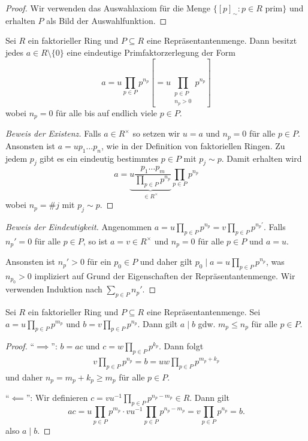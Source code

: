 \begin{proof}
	Wir verwenden das Auswahlaxiom für die Menge $\{[p]_{\sim}: p \in R \text{ prim}\} $ und erhalten
	$P$ als Bild der Auswahlfunktion.
\end{proof}

\begin{theorem}
	Sei $R$ ein faktorieller Ring und $P \subseteq R$ eine Repräsentantenmenge.
	Dann besitzt jedes $a \in R \setminus \{0\}$ eine eindeutige Primfaktorzerlegung
	der Form 
	\[
		a = u \prod_{p \in P} p^{n_p} \left[ = u \prod_{\substack{p \in P\\ n_{p} > 0}} p^{n_{p}}  \right]
	\] 
	wobei $n_{p} = 0$ für alle bis auf endlich viele $p \in P$.
\end{theorem}

\begin{proof}[Beweis der Existenz]
	Falls $a \in R^{\times}$ so setzen wir $u = a$ und $n_{p} = 0$ für alle $p \in P$.
	Ansonsten ist $a = u p_1 \ldots p_{n}$, wie in der Definition von faktoriellen Ringen.
	Zu jedem $p_{j}$ gibt es ein eindeutig bestimmtes $p \in P$ mit $p_{j} \sim p$.
	Damit erhalten wird
	\[
		a = \underbrace{u \frac{p_1 \ldots p_{m}}{\prod_{p \in P} p^{n_{p}} }}_{\in R^{\times}} \prod_{p \in P} p^{n_{p}}
	\] 
	wobei $n_{p} = \#j$ mit $p_{j} \sim p$.
\end{proof}

\begin{proof}[Beweis der Eindeutigkeit]
	Angenommen $a = u \prod_{p \in P} p^{n_{p}} = v \prod_{p \in P} p^{n_{p}'}$.
	Falls $n_{p}' = 0$ für alle $p \in  P$, so ist $a = v \in R^{\times}$ und $n_{p} = 0$ für alle $p \in P$ und $a = u$.

	Ansonsten ist $n_{p}' > 0$ für ein $p_0 \in P$ und daher gilt $p_0 \mid a = u \prod_{p \in P} p^{n_{p}}$,
	was $n_{p_0} > 0$ impliziert auf Grund der Eigenschaften der Repräsentantenmenge.
	Wir verwenden Induktion nach $\sum_{p \in P} n_{p}' $.
\end{proof}

\begin{lemma}
	Sei $R$ ein faktorieller Ring und $P \subseteq R$ eine Repräsentantenmenge.
	Sei $a = u \prod_{p \in P} p^{m_{p}}$ und $b = v \prod_{p \in P} p^{n_{p}}$.
	Dann gilt $a \mid b$ gdw. $m_{p} \leq n_{p}$ für alle $p \in P$.
\end{lemma}

\begin{proof}
	\enquote{$\implies$}: $b = ac$ und $c = w \prod_{p \in P} p^{k_{p}}$. Dann folgt
	\begin{align*}
		v  \prod_{p \in P} p^{n_{p}} = b = u w \prod_{p \in P} p^{m_{p} + k_{p}}
	\end{align*}
	und daher $n_{p} = m_{p} + k_{p} \geq m_{p}$ für alle $p \in P$.

	\enquote{$\impliedby$}: Wir definieren $c = v u^{-1} \prod_{p \in P} p^{n_{p} - m_{p}} \in R$.
	Dann gilt
	\[
	a c = u \prod_{p \in P} p^{m_{p}} \cdot v u^{-1} \prod_{p \in P} p^{n_{p} - m_{p}} = v \prod_{p \in P} p^{n_{p}} = b
	.\] 
	also $a \mid b$.
\end{proof}

